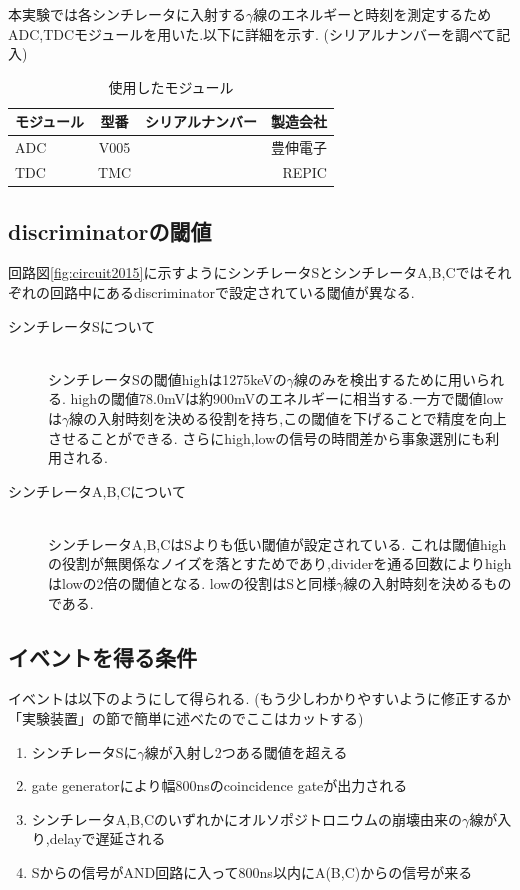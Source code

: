 本実験では各シンチレータに入射する$\gamma$線のエネルギーと時刻を測定するためADC,TDCモジュールを用いた.以下に詳細を示す.
(シリアルナンバーを調べて記入)
\begin{table}[htbp]
	\centering
		\caption{使用したモジュール}
		\begin{tabular}{|l|c|r|r|} \hline
			モジュール & 型番 & シリアルナンバー & 製造会社 \\ \hline \hline
			ADC & V005 & & 豊伸電子 \\ \hline
			TDC & TMC & & REPIC \\ \hline
		\end{tabular}
		\label{module}
\end{table}

\subsection{discriminatorの閾値}
回路図\ref{fig:circuit2015}に示すようにシンチレータSとシンチレータA,B,Cではそれぞれの回路中にあるdiscriminatorで設定されている閾値が異なる.
\begin{description}
	\item[シンチレータSについて]\mbox{}\\
		シンチレータSの閾値highは1275keVの$\gamma$線のみを検出するために用いられる.
		highの閾値78.0mVは約900mVのエネルギーに相当する.一方で閾値lowは$\gamma$線の入射時刻を決める役割を持ち,この閾値を下げることで精度を向上させることができる.
		さらにhigh,lowの信号の時間差から事象選別にも利用される.
	\item[シンチレータA,B,Cについて]\mbox{}\\
		シンチレータA,B,CはSよりも低い閾値が設定されている.
		これは閾値highの役割が無関係なノイズを落とすためであり,dividerを通る回数によりhighはlowの2倍の閾値となる.
		lowの役割はSと同様$\gamma$線の入射時刻を決めるものである.
\end{description}

\subsection{イベントを得る条件}
イベントは以下のようにして得られる.
(もう少しわかりやすいように修正するか「実験装置」の節で簡単に述べたのでここはカットする)
\begin{enumerate}
	\item シンチレータSに$\gamma$線が入射し2つある閾値を超える
	\item gate generatorにより幅800nsのcoincidence gateが出力される
	\item シンチレータA,B,Cのいずれかにオルソポジトロニウムの崩壊由来の$\gamma$線が入り,delayで遅延される
	\item Sからの信号がAND回路に入って800ns以内にA(B,C)からの信号が来る
\end{enumerate}

